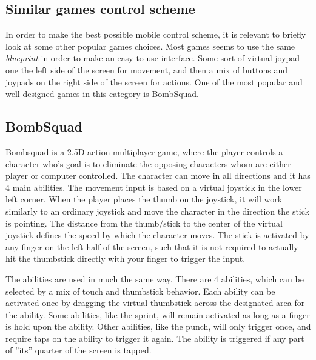 \subsection{Similar games control scheme}
In order to make the best possible mobile control scheme, it is relevant to briefly look at some other popular games choices.
Most games seems to use the same \emph{blueprint} in order to make an easy to use interface. Some sort of virtual joypad one the left side of the screen for movement, and then a mix of buttons and joypads on the right side of the screen for actions. 
One of the most popular and well designed games in this category is BombSquad.

\subsection*{BombSquad}\label{sec:modules:controlscheme:bombsquad}
Bombsquad\cite{bombsquad} is a 2.5D action multiplayer game, where the player controls a character who's goal is to eliminate the opposing characters whom are either player or computer controlled.
The character can move in all directions and it has 4 main abilities. 
The movement input is based on a virtual joystick in the lower left corner.
When the player places the thumb on the joystick, it will work similarly to an ordinary joystick and move the character in the direction the stick is pointing. 
The distance from the thumb/stick to the center of the virtual joystick defines the speed by which the character moves. 
The stick is activated by any finger on the left half of the screen, such that it is not required to actually hit the thumbstick directly with your finger to trigger the input.

The abilities are used in much the same way. 
There are 4 abilities, which can be selected by a mix of touch and thumbstick behavior. 
Each ability can be activated once by dragging the virtual thumbstick across the designated area for the ability. 
Some abilities, like the sprint, will remain activated as long as a finger is hold upon the ability. 
Other abilities, like the punch, will only trigger once, and require taps on the ability to trigger it again. 
The ability is triggered if any part of ''its'' quarter of the screen is tapped.


